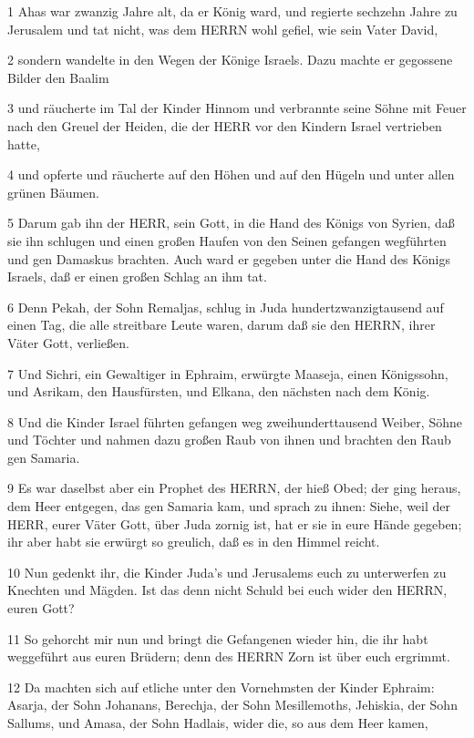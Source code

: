 \par 1 Ahas war zwanzig Jahre alt, da er König ward, und regierte sechzehn Jahre zu Jerusalem und tat nicht, was dem HERRN wohl gefiel, wie sein Vater David,
\par 2 sondern wandelte in den Wegen der Könige Israels. Dazu machte er gegossene Bilder den Baalim
\par 3 und räucherte im Tal der Kinder Hinnom und verbrannte seine Söhne mit Feuer nach den Greuel der Heiden, die der HERR vor den Kindern Israel vertrieben hatte,
\par 4 und opferte und räucherte auf den Höhen und auf den Hügeln und unter allen grünen Bäumen.
\par 5 Darum gab ihn der HERR, sein Gott, in die Hand des Königs von Syrien, daß sie ihn schlugen und einen großen Haufen von den Seinen gefangen wegführten und gen Damaskus brachten. Auch ward er gegeben unter die Hand des Königs Israels, daß er einen großen Schlag an ihm tat.
\par 6 Denn Pekah, der Sohn Remaljas, schlug in Juda hundertzwanzigtausend auf einen Tag, die alle streitbare Leute waren, darum daß sie den HERRN, ihrer Väter Gott, verließen.
\par 7 Und Sichri, ein Gewaltiger in Ephraim, erwürgte Maaseja, einen Königssohn, und Asrikam, den Hausfürsten, und Elkana, den nächsten nach dem König.
\par 8 Und die Kinder Israel führten gefangen weg zweihunderttausend Weiber, Söhne und Töchter und nahmen dazu großen Raub von ihnen und brachten den Raub gen Samaria.
\par 9 Es war daselbst aber ein Prophet des HERRN, der hieß Obed; der ging heraus, dem Heer entgegen, das gen Samaria kam, und sprach zu ihnen: Siehe, weil der HERR, eurer Väter Gott, über Juda zornig ist, hat er sie in eure Hände gegeben; ihr aber habt sie erwürgt so greulich, daß es in den Himmel reicht.
\par 10 Nun gedenkt ihr, die Kinder Juda's und Jerusalems euch zu unterwerfen zu Knechten und Mägden. Ist das denn nicht Schuld bei euch wider den HERRN, euren Gott?
\par 11 So gehorcht mir nun und bringt die Gefangenen wieder hin, die ihr habt weggeführt aus euren Brüdern; denn des HERRN Zorn ist über euch ergrimmt.
\par 12 Da machten sich auf etliche unter den Vornehmsten der Kinder Ephraim: Asarja, der Sohn Johanans, Berechja, der Sohn Mesillemoths, Jehiskia, der Sohn Sallums, und Amasa, der Sohn Hadlais, wider die, so aus dem Heer kamen,
